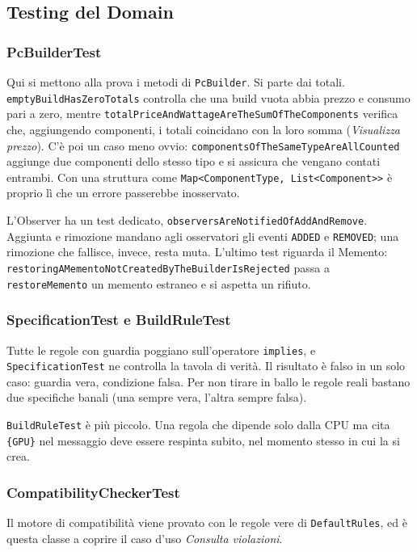 \documentclass[12pt,a4paper]{article}
\begin{document}
\subsection{Testing del Domain}

\subsubsection{PcBuilderTest}
Qui si mettono alla prova i metodi di \texttt{PcBuilder}. Si parte dai totali.
\texttt{emptyBuildHasZeroTotals} controlla che una build vuota abbia prezzo e consumo pari a zero, mentre
\texttt{totalPriceAndWattageAreTheSumOfTheComponents} verifica che, aggiungendo componenti, i totali
coincidano con la loro somma (\emph{Visualizza prezzo}). C'è poi un caso meno ovvio:
\texttt{componentsOfTheSameTypeAreAllCounted} aggiunge due componenti dello stesso tipo e si assicura che
vengano contati entrambi. Con una struttura come \texttt{Map<ComponentType, List<Component>>} è proprio
lì che un errore passerebbe inosservato.

L'Observer ha un test dedicato, \texttt{observersAreNotifiedOfAddAndRemove}. Aggiunta e rimozione mandano
agli osservatori gli eventi \texttt{ADDED} e \texttt{REMOVED}; una rimozione che fallisce, invece, resta
muta. L'ultimo test riguarda il Memento:
\texttt{restoringAMementoNotCreatedByTheBuilderIsRejected} passa a \texttt{restoreMemento} un memento
estraneo e si aspetta un rifiuto.

\subsubsection{SpecificationTest e BuildRuleTest}
Tutte le regole con guardia poggiano sull'operatore \texttt{implies}, e \texttt{SpecificationTest} ne
controlla la tavola di verità. Il risultato è falso in un solo caso: guardia vera, condizione falsa. Per
non tirare in ballo le regole reali bastano due specifiche banali (una sempre vera, l'altra sempre
falsa).

\texttt{BuildRuleTest} è più piccolo. Una regola che dipende solo dalla CPU ma cita \texttt{\{GPU\}} nel
messaggio deve essere respinta subito, nel momento stesso in cui la si crea.

\subsubsection{CompatibilityCheckerTest}
Il motore di compatibilità viene provato con le regole vere di \texttt{DefaultRules}, ed è questa classe
a coprire il caso d'uso \emph{Consulta violazioni}.
\end{document}
